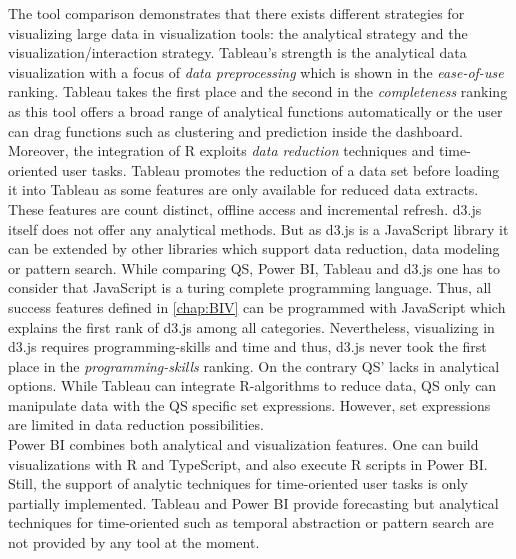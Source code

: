 The tool comparison demonstrates that there exists different strategies for visualizing  large data in visualization tools: the analytical strategy and the visualization/interaction strategy. Tableau's strength is the analytical data visualization with a focus of \textit{data preprocessing} which is shown in the \textit{ease-of-use} ranking. Tableau takes the first place and the second in the \textit{completeness} ranking as this tool offers a broad range of analytical functions automatically or the user can drag functions such as clustering and prediction inside the dashboard. Moreover, the integration of R exploits \textit{data reduction} techniques and time-oriented user tasks. Tableau  promotes the reduction of a data set before loading it into Tableau as some features are only available for reduced data extracts. These features are count distinct, offline access and incremental refresh. d3.js itself does not offer any analytical methods. But as d3.js is a JavaScript library it can be extended by other libraries which support data reduction, data modeling or pattern search. While comparing QS, Power BI, Tableau and d3.js one has to consider that JavaScript is a turing complete programming language. Thus, all success features defined in \ref{chap:BIV} can be programmed with JavaScript which explains the first rank of d3.js among all categories. Nevertheless, visualizing in d3.js requires programming-skills and time and thus, d3.js never took the first place in the \textit{programming-skills} ranking.
On the contrary QS' lacks in analytical options. While Tableau can integrate R-algorithms to reduce data, QS only can manipulate data with the QS specific set expressions. However, set expressions are limited in data reduction possibilities.\\
Power BI combines both analytical and visualization features. One can build visualizations with R and TypeScript, and also execute R scripts in Power BI. \\
Still, the support of analytic techniques for time-oriented user tasks is only partially implemented. Tableau and Power BI provide forecasting but analytical techniques for time-oriented such as temporal abstraction or pattern search are not provided by any tool at the moment.
\par

